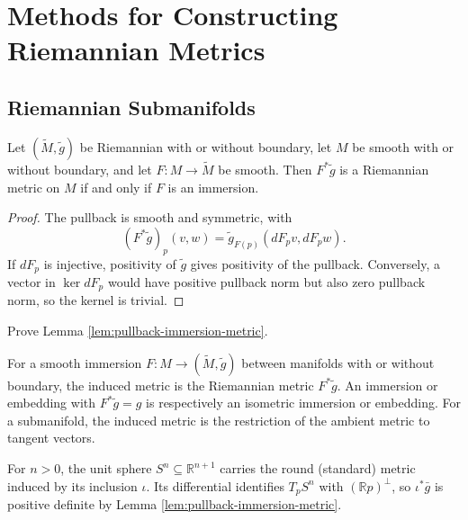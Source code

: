 \section{Methods for Constructing Riemannian Metrics}

\subsection*{Riemannian Submanifolds}

\begin{lemma}
\label{lem:pullback-immersion-metric}
\leanok
{}
Let $(\widetilde M,\widetilde g)$ be Riemannian with or without boundary, let $M$ be smooth with or without boundary, and let $F:M\to\widetilde M$ be smooth. Then $F^*\widetilde g$ is a Riemannian metric on $M$ if and only if $F$ is an immersion.
\end{lemma}
\begin{proof}
\leanok
{}
\sketch The pullback is smooth and symmetric, with
\[
(F^*\widetilde g)_p(v,w)=\widetilde g_{F(p)}(dF_pv,dF_pw).
\]
If $dF_p$ is injective, positivity of $\widetilde g$ gives positivity of the pullback. Conversely, a vector in $\ker dF_p$ would have positive pullback norm but also zero pullback norm, so the kernel is trivial.
\end{proof}

\begin{exercise}
\label{exer:prove-lemma-2-11}
\leanok
{}
Prove Lemma \ref{lem:pullback-immersion-metric}.
\end{exercise}

\begin{definition}
\label{def:induced-metric}
\leanok
{}
For a smooth immersion $F:M\to(\widetilde M,\widetilde g)$ between manifolds with or without boundary, the induced metric is the Riemannian metric $F^*\widetilde g$. An immersion or embedding with $F^*\widetilde g=g$ is respectively an isometric immersion or embedding. For a submanifold, the induced metric is the restriction of the ambient metric to tangent vectors.
\end{definition}

\begin{definition}[Spheres]
\label{ex:spheres}
\leanok
{}
For $n>0$, the unit sphere $S^n\subseteq\mathbb R^{n+1}$ carries the round (standard) metric induced by its inclusion $\iota$. Its differential identifies $T_pS^n$ with $(\mathbb Rp)^\perp$, so $\iota^*\bar g$ is positive definite by Lemma \ref{lem:pullback-immersion-metric}.
\end{definition}

